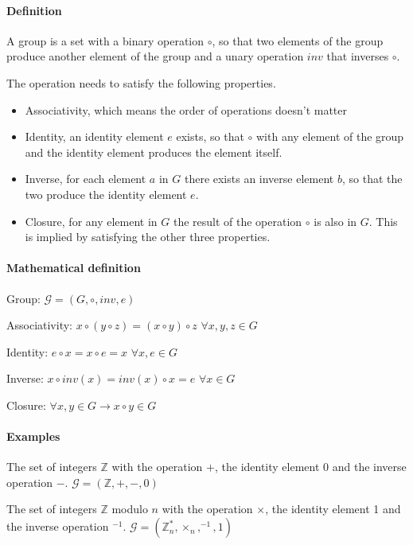 \documentclass[a4paper,12pt]{scrartcl}
\begin{document}
\paragraph{Definition}\hfill

A group is a set with a binary operation $\circ$, so that two elements of the group produce another element of the group and a unary operation $inv$ that inverses $\circ$.

The operation needs to satisfy the following properties.
\begin{itemize}
	\item Associativity, which means the order of operations doesn't matter
	\item Identity, an identity element $e$ exists, so that $\circ$ with any element of the group and the identity element produces the element itself.
	\item Inverse, for each element $a$ in $G$ there exists an inverse element $b$, so that the two produce the identity element $e$.
	\item Closure, for any element in $G$ the result of the operation $\circ$ is also in $G$. This is implied by satisfying the other three properties.
\end{itemize}

\paragraph{Mathematical definition}\hfill

Group: $\mathcal{G} = (G, \circ, inv, e)$

Associativity: $ x \circ (y \circ z) = (x \circ y) \circ z$ $\forall x,y,z \in G $

Identity: $ e \circ x = x \circ e = x $ $ \forall x,e  \in G $

Inverse: $ x \circ inv(x) = inv(x) \circ x = e $ $ \forall x \in G $

Closure: $ \forall x,y \in G \rightarrow x \circ y \in G $

\paragraph{Examples}\hfill

The set of integers $\mathbb{Z}$ with the operation $+$, the identity element 0 and the inverse operation $-$. $\mathcal{G} = (\mathbb{Z},+,-,0)$

The set of integers $\mathbb{Z}$ modulo $n$ with the operation $\times$, the identity element 1 and the inverse operation $^{-1}$. $\mathcal{G} = (\mathbb{Z}_{n}^*, \times_{n}, ^{-1}, 1)$
\end{document}
